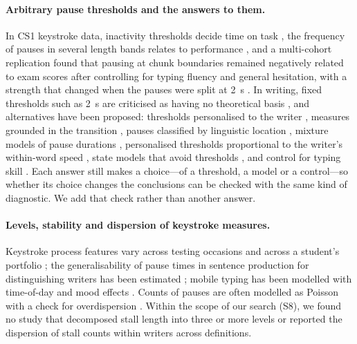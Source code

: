 \paragraph{Arbitrary pause thresholds and the answers to them.} In CS1 keystroke data, inactivity thresholds decide time
on task \cite{hart2023time,hart2025time,edwards2022engagement}, the frequency of pauses in several length bands relates to
performance \cite{shrestha2022pausing}, and a multi-cohort replication found that pausing at chunk boundaries remained
negatively related to exam scores after controlling for typing fluency and general hesitation, with a strength that
changed when the pauses were split at 2~s \cite{koutcheme2026keystroke}. In writing, fixed thresholds such as 2~s are
criticised as having no theoretical basis \cite{torrance2024methods,roeser2024disfluencies}, and alternatives have been
proposed: thresholds personalised to the writer \cite{chukharev2014pauses}, measures grounded in the transition
\cite{hall2024constructing}, pauses classified by linguistic location \cite{medimorec2017pauses}, mixture models of
pause durations \cite{baaijen2012keystroke,almond2012preliminary,li2021mixture,litvinova2024investigating}, personalised
thresholds proportional to the writer's within-word speed \cite{guo2020scenario}, state models
that avoid thresholds \cite{garcesmanzanera2026modeling}, and control for typing skill \cite{alves2007typing}. Each
answer still makes a choice---of a threshold, a model or a control---so whether its choice changes the conclusions can
be checked with the same kind of diagnostic. We add that check rather than another answer.

\paragraph{Levels, stability and dispersion of keystroke measures.} Keystroke process features vary across testing
occasions \cite{deane2015feasibility} and across a student's portfolio \cite{babalola2026stability}; the generalisability
of pause times in sentence production for distinguishing writers has been estimated
\cite{meulemans2022generalizability}; mobile typing has been modelled with time-of-day and mood effects
\cite{vesel2020biaffect}. Counts of pauses are often modelled as Poisson with a check for overdispersion
\cite{gullberg2025deceit}. Within the scope of our search (S8), we found no study that decomposed stall length into
three or more levels or reported the dispersion of stall counts within writers across definitions.

